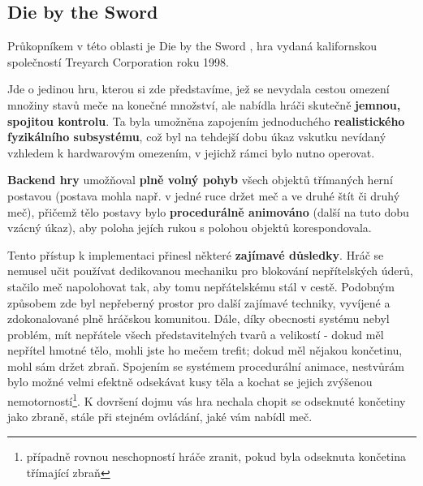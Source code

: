 \subsection{Die by the Sword}

Průkopníkem v této oblasti je Die by the Sword \cite{DieByTheSword}, hra vydaná kalifornskou společností Treyarch Corporation roku 1998. 

Jde o jedinou hru, kterou si zde představíme, jež se nevydala cestou omezení množiny stavů meče na konečné množství, ale nabídla hráči skutečně \textbf{jemnou, spojitou kontrolu}. Ta byla umožněna zapojením jednoduchého \textbf{realistického fyzikálního subsystému}, což byl na tehdejší dobu úkaz vskutku nevídaný vzhledem k hardwarovým omezením, v jejichž rámci bylo nutno operovat.

\textbf{Backend hry} umožňoval \textbf{plně volný pohyb} všech objektů třímaných herní postavou (postava mohla např. v jedné ruce držet meč a ve druhé štít či druhý meč), přičemž tělo postavy bylo \textbf{procedurálně animováno} (další na tuto dobu vzácný úkaz), aby poloha jejích rukou s polohou objektů korespondovala.

Tento přístup k implementaci přinesl některé \textbf{zajímavé důsledky}. Hráč se nemusel učit používat dedikovanou mechaniku pro blokování nepřítelských úderů, stačilo meč napolohovat tak, aby tomu nepřátelskému stál v cestě. Podobným způsobem zde byl nepřeberný prostor pro další zajímavé techniky, vyvíjené a zdokonalované plně hráčskou komunitou. Dále, díky obecnosti systému nebyl problém, mít nepřátele všech představitelných tvarů a velikostí - dokud měl nepřítel hmotné tělo, mohli jste ho mečem trefit; dokud měl nějakou končetinu, mohl sám držet zbraň. Spojením se systémem procedurální animace, nestvůrám bylo možné velmi efektně odsekávat kusy těla a kochat se jejich zvýšenou nemotorností\footnote{případně rovnou neschopností hráče zranit, pokud byla odseknuta končetina třímající zbraň}. K dovršení dojmu vás hra nechala chopit se odseknuté končetiny jako zbraně, stále při stejném ovládání, jaké vám nabídl meč.

